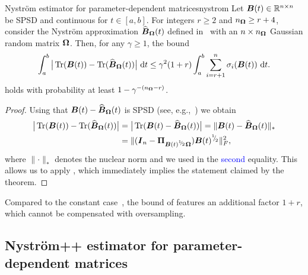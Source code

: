 \begin{theorem}{Nyström estimator for parameter-dependent matrices}{nystrom}
    Let $\boldsymbol{B}(t) \in \mathbb{R}^{n \times n}$ be SPSD and continuous for $t \in [a, b]$. For integers $r \geq 2$ and $n_{\boldsymbol{\Omega}} \geq r + 4$, consider the Nystr\"om approximation $\widehat{\boldsymbol{B}}_{\boldsymbol{\Omega}}(t)$ defined in~ with an $n\times n_{\boldsymbol{\Omega}}$ Gaussian random matrix $\boldsymbol{\Omega}$. Then, for any $\gamma \geq 1$, the bound 
    \[
        \int_{a}^{b} \big| \operatorname{Tr}(\boldsymbol{B}(t)) - \operatorname{Tr}(\widehat{\boldsymbol{B}}_{\boldsymbol{\Omega}}(t)) \big| ~\mathrm{d}t
        \leq \gamma^2 (1 + r) \int_{a}^{b} \sum_{i = r+1}^{n} \sigma_i(\boldsymbol{B}(t)) ~\mathrm{d}t.
    \]
    holds with probability at least $1 - \gamma^{-(n_{\boldsymbol{\Omega}} - r)}$.
\end{theorem}
\begin{proof}
Using that $\boldsymbol{B}(t) - \widehat{\boldsymbol{B}}_{\boldsymbol{\Omega}}(t)$ is SPSD (see, e.g.,~\cite[Lemma 2.1]{frangella-2023-randomized-nystrom}) we obtain
    \begin{align*}
        \big| \operatorname{Tr}(\boldsymbol{B}(t)) - \operatorname{Tr}(\widehat{\boldsymbol{B}}_{\boldsymbol{\Omega}}(t)) \big|
        & = \big| \operatorname{Tr}(\boldsymbol{B}(t) - \widehat{\boldsymbol{B}}_{\boldsymbol{\Omega}}(t)) \big|
        = \lVert \boldsymbol{B}(t) - \widehat{\boldsymbol{B}}_{\boldsymbol{\Omega}}(t) \rVert _{\ast} \\
        & = \lVert (\boldsymbol{I}_n - \boldsymbol{\Pi}_{\boldsymbol{B}(t)^{{}^{1}{\mskip -5mu/\mskip -3mu}_{2}} \boldsymbol{\Omega}}) \boldsymbol{B}(t)^{{}^{1}{\mskip -5mu/\mskip -3mu}_{2}} \rVert _F^2,
    \end{align*}
    where $\lVert \cdot \rVert _{\ast}$ denotes the nuclear norm and we used \cite[Theorem 1]{gittens-2011-spectral-norm} in the \textcolor{blue}{second} equality. This allows us to apply \cite[Theorem 5]{kressner-2024-randomized-lowrank}, which immediately implies the statement claimed by the theorem.
\end{proof}

Compared to the constant case~\cite[Theorem 8.1]{tropp-2023-randomized-algorithms}, the bound of  features an additional factor $1+r$, which cannot be compensated with oversampling.

\subsection{Nyström++ estimator for parameter-dependent matrices}
\label{subsec:nystrom-pp}


